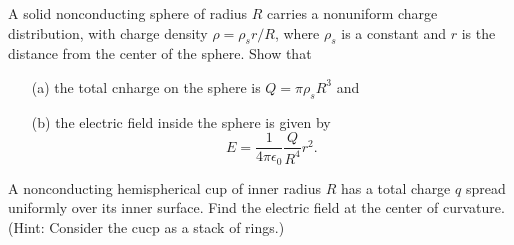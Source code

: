 \documentclass[12pt,letterpaper,boxed,cm]{hmcpset}
\newcommand{\f}[2]{\frac{#1}{#2}}
\begin{document}
\begin{problem}[27-P17]
A solid nonconducting sphere of radius $R$ carries a nonuniform charge distribution, with charge density $\rho = \rho_s r/R$, where $\rho_s$ is a constant and $r$ is the distance from the center of the sphere. Show that
\begin{enumerate}
	\item[(a)] the total cnharge on the sphere is $Q = \pi\rho_sR^3$ and
	\item[(b)] the electric field inside the sphere is given by
\[
	E = \f{1}{4\pi\epsilon_0} \f{Q}{R^4} r^2.
\]
\end{enumerate}
\end{problem}
\begin{solution}
\end{solution}
\newpage

\begin{problem}[SUP1*]
A nonconducting hemispherical cup of inner radius $R$ has a total charge $q$ spread uniformly over its inner surface. Find the electric field at the center of curvature. (Hint: Consider the cucp as a stack of rings.)
\end{problem}
\begin{solution}
\end{solution}
\end{document}
